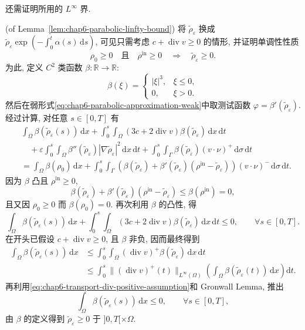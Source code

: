 \begin{sloppypar}
还需证明所用的 $L^\infty$ 界.

\begin{Proof}
\textup{(of Lemma~\ref{lem:chap6-parabolic-linfty-bound})}
将 $\widetilde\rho_\varepsilon$ 换成
$\widetilde\rho_\varepsilon\exp\left(-\int_0^t\alpha(s)\,\mathrm ds\right)$, 可见只需考虑 $c+\operatorname{div}v\geq0$ 的情形, 并证明单调性性质
\[
 \rho_0\geq0\quad\text{且}\quad\rho^{\mathrm{in}}\geq0
 \quad\Longrightarrow\quad\widetilde\rho_\varepsilon\geq0.
\]
为此, 定义 $C^2$ 类函数 $\beta:\mathbb R\to\mathbb R$:
\[
 \beta(\xi)=
 \begin{cases}
  |\xi|^3,&\xi\leq0,\\
  0,&\xi>0.
 \end{cases}
\]
然后在弱形式\eqref{eq:chap6-parabolic-approximation-weak}中取测试函数 $\varphi=\beta'(\widetilde\rho_\varepsilon)$. 经过计算, 对任意 $s\in[0,T]$ 有
\[
\begin{aligned}
 &\int_\Omega\beta(\widetilde\rho_\varepsilon(s))\,\mathrm dx
 +\int_0^s\int_\Omega(3c+2\operatorname{div}v)
 \beta(\widetilde\rho_\varepsilon)\,\mathrm dx\,\mathrm dt\\
 &\quad+\varepsilon\int_0^s\int_\Omega
 \beta''(\widetilde\rho_\varepsilon)|\nabla\widetilde\rho_\varepsilon|^2
 \,\mathrm dx\,\mathrm dt
 +\int_0^s\int_\Gamma\beta(\widetilde\rho_\varepsilon)(v\cdot\nu)^+
 \,\mathrm d\sigma\,\mathrm dt\\
 &=\int_\Omega\beta(\rho_0)\,\mathrm dx
 +\int_0^s\int_\Gamma
 \left(\beta(\widetilde\rho_\varepsilon)
 +\beta'(\widetilde\rho_\varepsilon)(\rho^{\mathrm{in}}-\widetilde\rho_\varepsilon)\right)
 (v\cdot\nu)^-\,\mathrm d\sigma\,\mathrm dt.
\end{aligned}
\]
因为 $\beta$ 凸且 $\rho^{\mathrm{in}}\geq0$,
\[
 \beta(\widetilde\rho_\varepsilon)
 +\beta'(\widetilde\rho_\varepsilon)(\rho^{\mathrm{in}}-\widetilde\rho_\varepsilon)
 \leq\beta(\rho^{\mathrm{in}})=0,
\]
且又因 $\rho_0\geq0$ 而 $\beta(\rho_0)=0$. 再次利用 $\beta$ 的凸性, 得
\[
 \int_\Omega\beta(\widetilde\rho_\varepsilon(s))\,\mathrm dx
 +\int_0^s\int_\Omega(3c+2\operatorname{div}v)
 \beta(\widetilde\rho_\varepsilon)\,\mathrm dx\,\mathrm dt\leq0,
 \qquad\forall s\in[0,T].
\]
在开头已假设 $c+\operatorname{div}v\geq0$, 且 $\beta$ 非负, 因而最终得到
\[
\begin{aligned}
 \int_\Omega\beta(\widetilde\rho_\varepsilon(s))\,\mathrm dx
 &\leq\int_0^s\int_\Omega(\operatorname{div}v)^+
 \beta(\widetilde\rho_\varepsilon)\,\mathrm dx\,\mathrm dt\\
 &\leq\int_0^s\|(\operatorname{div}v)^+(t)\|_{L^\infty(\Omega)}
 \left(\int_\Omega\beta(\widetilde\rho_\varepsilon(t))\,\mathrm dx\right)\mathrm dt.
\end{aligned}
\]
再利用\eqref{eq:chap6-transport-div-positive-assumption}和 Gronwall Lemma, 推出
\[
 \int_\Omega\beta(\widetilde\rho_\varepsilon(s))\,\mathrm dx\leq0,
 \qquad\forall s\in[0,T],
\]
由 $\beta$ 的定义得到 $\widetilde\rho_\varepsilon\geq0$ 于 $]0,T[\times\Omega$.
\end{Proof}


\end{sloppypar}
